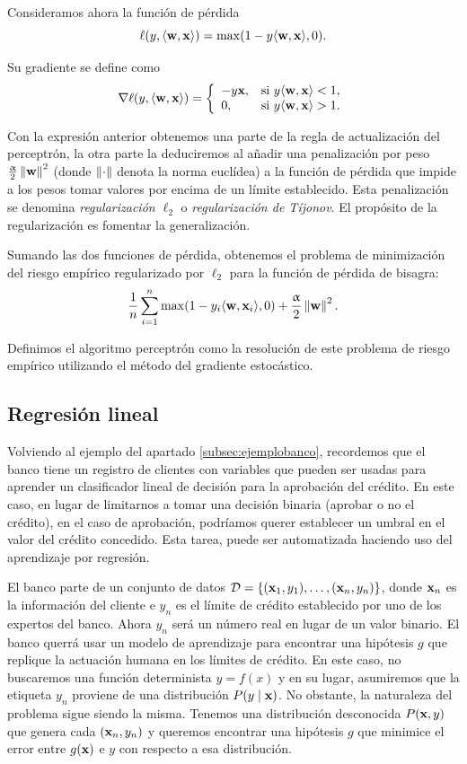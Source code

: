 \documentclass[oneside,openright,titlepage,numbers=noenddot,openany,headinclude,footinclude=true,
cleardoublepage=empty,abstractoff,BCOR=5mm,paper=a4,fontsize=12pt,main=spanish]{scrreprt}
\begin{document}
Consideramos ahora la función de pérdida $$\ell(y,\langle \textbf{w},\textbf{x} \rangle)=\max (1-y\langle \textbf{w},\textbf{x} \rangle,0).$$

Su gradiente se define como $$\nabla \ell (y,\langle \textbf{w},\textbf{x} \rangle)=\left \{
\begin{array}{l l}
-y\textbf{x}, & \mbox{si } y\langle \textbf{w},\textbf{x} \rangle < 1, \\
0, & \mbox{si } y\langle \textbf{w},\textbf{x} \rangle > 1.
\end{array}
\right.$$

Con la expresión anterior obtenemos una parte de la regla de actualización del perceptrón, la otra parte la deduciremos al añadir una penalización por peso $\frac{\upalpha}{2}\left\lVert\textbf{w}\right\rVert^2$ (donde $\left\lVert\cdot\right\rVert$ denota la norma euclídea) a la función de pérdida que impide a los pesos tomar valores por encima de un límite establecido. Esta penalización se denomina \textit{regularización $\ell_2$} o \textit{regularización de Tíjonov}. El propósito de la regularización es fomentar la generalización.

Sumando las dos funciones de pérdida, obtenemos el problema de minimización del riesgo empírico regularizado por $\ell_2$ para la función de pérdida de bisagra: $$\frac{1}{n}\sum_{i=1}^n \max (1-y_i\langle \textbf{w},\textbf{x}_i \rangle,0)+\frac{\upalpha}{2}\left\lVert\textbf{w}\right\rVert^2.$$

Definimos el algoritmo perceptrón como la resolución de este problema de riesgo empírico utilizando el método del gradiente estocástico.

\subsection{Regresión lineal}

Volviendo al ejemplo del apartado \ref{subsec:ejemplobanco}, recordemos que el banco tiene un registro de clientes con variables que pueden ser usadas para aprender un clasificador lineal de decisión para la aprobación del crédito. En este caso, en lugar de limitarnos a tomar una decisión binaria (aprobar o no el crédito), en el caso de aprobación, podríamos querer establecer un umbral en el valor del crédito concedido. Esta tarea, puede ser automatizada haciendo uso del aprendizaje por regresión. 

El banco parte de un conjunto de datos $\mathcal{D}=\{(\textbf{x}_1,y_1),\dots,(\textbf{x}_n,y_n)\}$, donde $\textbf{x}_n$ es la información del cliente e $y_n$ es el límite de crédito establecido por uno de los expertos del banco. Ahora $y_n$ será un número real en lugar de un valor binario. El banco querrá usar un modelo de aprendizaje para encontrar una hipótesis $g$ que replique la actuación humana en los límites de crédito. En este caso, no buscaremos una función determinista $y = f(x)$ y en su lugar, asumiremos que la etiqueta $y_n$ proviene de una distribución $P(y \mid \textbf{x})$. No obstante, la naturaleza del problema sigue siendo la misma. Tenemos una distribución desconocida $P(\textbf{x}, y)$ que genera cada $(\textbf{x}_n, y_n)$ y queremos encontrar una hipótesis $g$ que minimice el error entre $g(\textbf{x})$ e $y$ con respecto a esa distribución.
\end{document}
